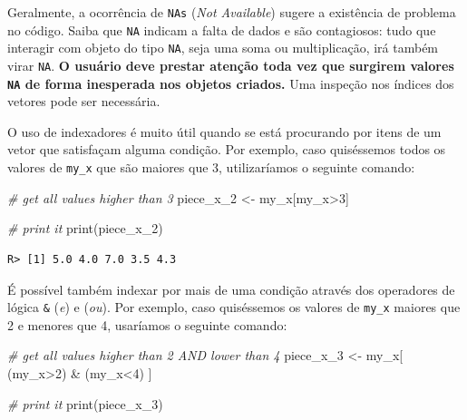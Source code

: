 \documentclass[
  11pt,
]{book}
\newenvironment{Shaded}{\begin{snugshade}}{\end{snugshade}}
\newcommand{\CommentTok}[1]{\textcolor[rgb]{0.37,0.37,0.37}{\textit{#1}}}
\newcommand{\DecValTok}[1]{\textcolor[rgb]{0.06,0.06,0.06}{#1}}
\newcommand{\FunctionTok}[1]{\textcolor[rgb]{0,0,0}{#1}}
\newcommand{\NormalTok}[1]{#1}
\newcommand{\OtherTok}[1]{\textcolor[rgb]{0.37,0.37,0.37}{#1}}
\newcommand{\SpecialCharTok}[1]{\textcolor[rgb]{0,0,0}{#1}}
\newenvironment{rmdimportant}
{\begin{importantblock}

	} {\end{importantblock}}
\begin{document}
\begin{rmdimportant}
Geralmente, a ocorrência de \texttt{NAs} (\emph{Not Available}) sugere a
existência de problema no código. Saiba que \texttt{NA} indicam a falta
de dados e são contagiosos: tudo que interagir com objeto do tipo
\texttt{NA}, seja uma soma ou multiplicação, irá também virar
\texttt{NA}. \textbf{O usuário deve prestar atenção toda vez que
surgirem valores \texttt{NA} de forma inesperada nos objetos criados.}
Uma inspeção nos índices dos vetores pode ser necessária.
\end{rmdimportant}

O uso de indexadores é muito útil quando se está procurando por itens de um vetor que satisfaçam alguma condição. Por exemplo, caso quiséssemos todos os valores de \texttt{my\_x} que são maiores que 3, utilizaríamos o seguinte comando:

\begin{Shaded}
\begin{Highlighting}[]
\CommentTok{\# get all values higher than 3}
\NormalTok{piece\_x\_2 }\OtherTok{\textless{}{-}}\NormalTok{ my\_x[my\_x}\SpecialCharTok{\textgreater{}}\DecValTok{3}\NormalTok{]}

\CommentTok{\# print it}
\FunctionTok{print}\NormalTok{(piece\_x\_2)}
\end{Highlighting}
\end{Shaded}

\begin{verbatim}
R> [1] 5.0 4.0 7.0 3.5 4.3
\end{verbatim}

É possível também indexar por mais de uma condição através dos operadores de lógica \texttt{\&} (\emph{e}) e \texttt{\textbar{}} (\emph{ou}). Por exemplo, caso quiséssemos os valores de \texttt{my\_x} maiores que 2 e menores que 4, usaríamos o seguinte comando:

\begin{Shaded}
\begin{Highlighting}[]
\CommentTok{\# get all values higher than 2 AND lower than 4}
\NormalTok{piece\_x\_3 }\OtherTok{\textless{}{-}}\NormalTok{ my\_x[ (my\_x}\SpecialCharTok{\textgreater{}}\DecValTok{2}\NormalTok{) }\SpecialCharTok{\&}\NormalTok{ (my\_x}\SpecialCharTok{\textless{}}\DecValTok{4}\NormalTok{) ]}

\CommentTok{\# print it}
\FunctionTok{print}\NormalTok{(piece\_x\_3)}
\end{Highlighting}
\end{Shaded}
\end{document}
